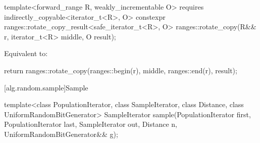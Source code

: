 \begin{itemdecl}
template<forward_range R, weakly_incrementable O>
  requires indirectly_copyable<iterator_t<R>, O>
  constexpr ranges::rotate_copy_result<safe_iterator_t<R>, O>
    ranges::rotate_copy(R&& r, iterator_t<R> middle, O result);
\end{itemdecl}

\begin{itemdescr}
\pnum
\effects
Equivalent to:
\begin{codeblock}
return ranges::rotate_copy(ranges::begin(r), middle, ranges::end(r), result);
\end{codeblock}
\end{itemdescr}

[alg.random.sample]{Sample}

%
\begin{itemdecl}
template<class PopulationIterator, class SampleIterator,
         class Distance, class UniformRandomBitGenerator>
  SampleIterator sample(PopulationIterator first, PopulationIterator last,
                        SampleIterator out, Distance n,
                        UniformRandomBitGenerator&& g);
\end{itemdecl}

